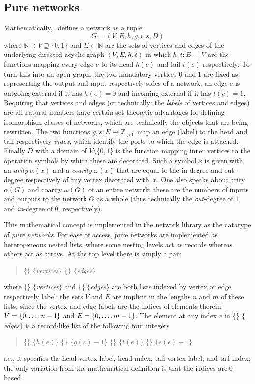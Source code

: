 \documentclass{article}
\newcommand{\N}{\mathbb{N}}
\newcommand{\Z}{\mathbb{Z}}
\theoremstyle{definition}
\newcommand{\word}[1]{%
   \relax
   \ifmmode
     \{\text{\normalfont\itshape #1}\}%
   \else
     $\{$\textnormal{\itshape #1}$\}$%
   \fi
}
\begin{document}
\subsection{Pure networks}
\label{Ssec:PureNetwork}

Mathematically, \cite{NR1}~defines a network as a tuple
\[
  G = (V,E,h,g,t,s,D)
\]
where \(\N \supset V \supseteq \{0,1\}\) and \(E \subset \N\) are the 
sets of vertices and edges of the underlying directed acyclic graph 
$(V,E,h,t)$ in which \(h,t\colon E \longrightarrow V\) are the 
functions mapping every edge $e$ to its head $h(e)$ and tail $t(e)$ 
respectively. To turn this into an open graph, the two mandatory 
vertices $0$ and $1$ are fixed as representing the output and input 
respectively sides of a network; an edge $e$ is outgoing external if 
it has \(h(e)=0\) and incoming external if it has \(t(e)=1\). 
Requiring that vertices and edges (or technically: the \emph{labels} 
of vertices and edges) are all natural numbers have certain 
set-theoretic advantages for defining isomorphism classes of 
networks, which are technically the objects that are being rewritten. 
The two functions \(g,s\colon E \longrightarrow \Z_{>0}\) map an edge 
(label) to the head and tail respectively \emph{index}, which 
identify the ports to which the edge is attached. Finally $D$ with a 
domain of $V \setminus \{0,1\}$ is the function mapping inner 
vertices to the operation symbols by which these are decorated. Such 
a symbol $x$ is given with an \emph{arity} $\alpha(x)$ and a 
\emph{coarity} $\omega(x)$ that are equal to the in-degree and 
out-degree respectively of any vertex decorated with~$x$. One also 
speaks about arity $\alpha(G)$ and coarity $\omega(G)$ of an entire 
network; these are the numbers of inputs and outputs to the network 
$G$ as a whole (thus technically the \emph{out}-degree of $1$ and 
\textit{in}-degree of $0$, respectively).

This mathematical concept is implemented in the network library as the 
datatype of \emph{pure networks}.
For ease of access, pure networks are implemented as heterogeneous 
nested lists, where some nesting levels act as records whereas others 
act as arrays. At the top level there is simply a pair
\begin{quote}
  \word{vertices} \word{edges}
\end{quote}
where \word{vertices} and \word{edges} are both lists indexed by 
vertex or edge respectively label; the sets $V$ and $E$ are implicit 
in the lengths $n$ and $m$ of these lists, since the vertex and edge 
labels are the indices of elements therein: \(V = \{0,\dotsc, n 
-\nobreak 1\}\) and \(E = \{0, \dotsc, m -\nobreak 1\}\). The element 
at any index $e$ in \word{edges} is a record-like list of the 
following four integers
\begin{quote}
  \word{$h(e)$} \word{$g(e)-1$} \word{$t(e)$} \word{$s(e)-1$}
\end{quote}
i.e., it specifies the head vertex label, head index, tail vertex 
label, and tail index; the only variation from the mathematical 
definition is that the indices are $0$-based.
\end{document}
